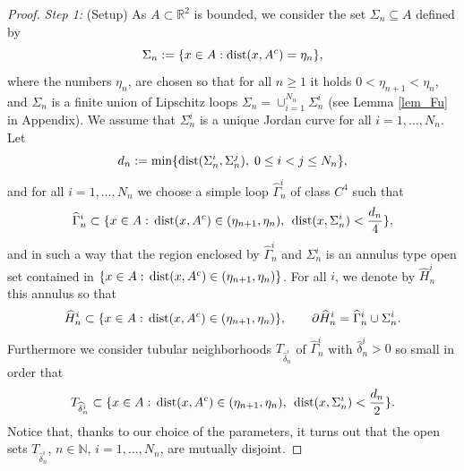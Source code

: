 \documentclass[a4paper,11pt]{article}
\numberwithin{equation}{section}
\def\dist{\,{\rm dist}}
\newcommand{\R}{\mathbb{R}}
\begin{document}
\begin{proof}

\textit{Step 1:} (Setup)
As $A\subset\R^2$ is bounded, we consider the set $\Sigma_n\subseteq A$ defined by 
$$\Sigma_n:=\{x\in A:\text{{\rm dist}}(x,A^c)=\eta_n\},$$
where the numbers $\eta_n$,  are chosen so that for all $n\geq1$ it holds
$0<\eta_{n+1}<\eta_n$, and  $\Sigma_n$ is a finite union of Lipschitz loops $\Sigma_n=\cup_{i=1}^{N_n}\Sigma^i_n$ (see Lemma \ref{lem_Fu} in Appendix). 
We assume that $\Sigma_n^i$ is a unique Jordan curve for all $i=1,\dots,N_n$. 
Let \begin{align}\label{dn}
	d_n:=\min\{\text{{\rm dist}}(\Sigma_n^i,\Sigma_n^j),\;0\leq i<j\leq N_n\},%
\end{align}
and for all $i=1,\dots,N_n$ we choose a simple loop $\widehat \Gamma_n^i$ of class $C^4$ such that  
$$\widehat \Gamma_n^i\subset\{x\in A:\dist(x,A^c)\in (\eta_{n+1},\eta_n),\; \dist(x,\Sigma_n^i)<\frac{d_n}{4}\},$$
and in such a way that the region enclosed by $ \widehat \Gamma_n^i$ and $\Sigma_n^i$ is an annulus type open set contained in $\{x\in A:\dist(x,A^c)\in (\eta_{n+1},\eta_n)\}$. For all $i$, we denote by $\widehat H_{n}^i$ this annulus so that
$$\widehat H_{n}^i\subset \{x\in A:\dist(x,A^c)\in (\eta_{n+1},\eta_n)\},\qquad \partial \widehat H_{n}^i= \widehat \Gamma_n^i\cup  \Sigma_n^i.$$
Furthermore we consider tubular neighborhoods $T_{\widehat \delta_n^i}$ of $\widehat \Gamma_n^i$ with $\widehat \delta_{n}^i>0$ so small in order that $$T_{\widehat \delta_n^i}\subset \{x\in A:\dist(x,A^c)\in (\eta_{n+1},\eta_n),\; \dist(x, \Sigma_n^i)<\frac{d_n}{2}\}.$$
Notice that, thanks to our choice of the parameters, it turns out that the open sets $T_{\widehat \delta_{n}^i}$, $n\in\mathbb N$, $i=1,\dots,N_n$, are mutually disjoint.







\end{proof}
\end{document}
